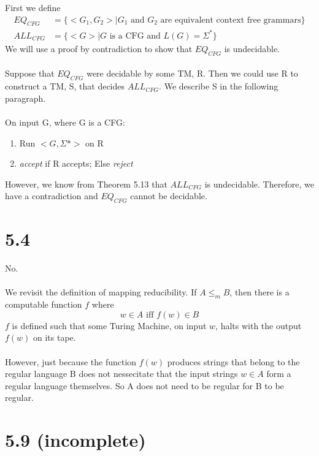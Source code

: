 \documentclass{article}
\begin{document}
First we define
\begin{align*}
    EQ_{CFG} &= \{ <G_1, G_2> | G_1 \textrm{ and } G_2 \textrm{ are equivalent context free grammars} \}\\
    ALL_{CFG} &= \{ <G> | G \textrm{ is a CFG and } L(G) = \Sigma^* \} 
\end{align*} 
We will use a proof by contradiction to show that $EQ_{CFG}$ is undecidable.\\\\
Suppose that $EQ_{CFG}$ were decidable by some TM, R. Then we could use R to construct a TM, S, that decides $ALL_{CFG}$. We describe S in the following paragraph.\\\\
On input G, where G is a CFG:
\begin{enumerate}
    \item Run $<G, \Sigma*>$ on R
    \item \textit{accept} if R accepts; Else \textit{reject}
\end{enumerate}
However, we know from Theorem 5.13 that $ALL_{CFG}$ is undecidable. Therefore, we have a contradiction and $EQ_{CFG}$ cannot be decidable.

\section*{5.4}

No.\\\\
We revisit the definition of mapping reducibility. If $A \leq_m B$, then there is a computable function $f$ where
$$w \in A \textrm{  iff   } f(w) \in B$$
$f$ is defined such that some Turing Machine, on input $w$, halts with the output $f(w)$ on its tape. \\\\
However, just because the function $f(w)$ produces strings that belong to the regular language B does not nessecitate that the input strings $w \in A$ form a regular language themselves. So A does not need to be regular for B to be regular.

\section*{5.9 (incomplete)}
\end{document}
